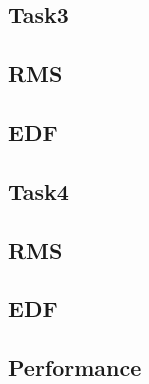 \documentclass{article}
\begin{document}
    \subsection{Task3}
    \subsection{RMS}
    
    \subsection{EDF}
    
   
    \subsection{Task4}
    \subsection{RMS}
    
    \subsection{EDF}
    
    
    \subsection{Performance}
    
    
\end{document}
